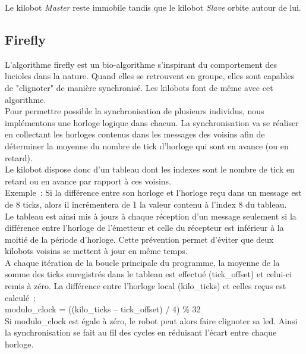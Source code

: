 \documentclass[a4paper,8pt]{report}
\begin{document}
Le kilobot \textit{Master} reste immobile tandis que le kilobot \textit{Slave} orbite autour de lui.\\

\subsection*{Firefly}\label{subsec:name}

L'algorithme firefly est un bio-algorithme s'inspirant du comportement des lucioles dans la nature. Quand elles se retrouvent en groupe, elles sont capables de "clignoter" de manière synchronisé.
Les kilobots font de même avec cet algorithme.\\

Pour permettre possible la synchronisation de plusieurs individus, nous implémentons une horloge logique dans chacun. La synchronisation va se réaliser en collectant les horloges contenus dans les messages des voisins afin de déterminer la moyenne du nombre de tick d'horloge qui sont en avance (ou en retard).\\

Le kilobot dispose donc d'un tableau dont les indexes sont le nombre de tick en retard ou en avance par rapport à ces voisins.\\
Exemple : Si la différence entre son horloge et l'horloge reçu dans un message est de 8 ticks, alors il incrémentera de 1 la valeur contenu à l'index 8 du tableau.\\
Le tableau est ainsi mis à jours à chaque réception d'un message seulement si la différence entre l'horloge de l’émetteur et celle du récepteur est inférieur à la moitié de la période d'horloge. Cette prévention permet d'éviter que deux kilobots voisins se mettent à jour en même temps.\\

A chaque itération de la boucle principale du programme, la moyenne de la somme des ticks enregistrés dans le tableau est effectué (tick\_offset) et celui-ci remis à zéro. La différence entre l'horloge local (kilo\_ticks) et celles reçus est calculé :\\

modulo\_clock = ((kilo\_ticks – tick\_offset) / 4) \% 32\\

Si modulo\_clock est égale à zéro, le robot peut alors faire clignoter sa led. 
Ainsi la synchronisation se fait au fil des cycles en réduisant l'écart entre chaque horloge.
\end{document}
